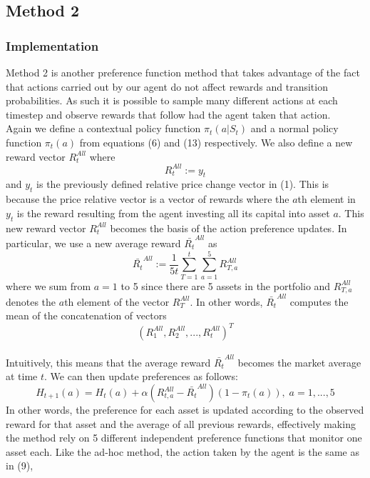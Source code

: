 \documentclass[a4paper,12pt]{article}
\begin{document}
\subsection{Method 2}

\subsubsection{Implementation}
Method 2 is another preference function method that takes advantage of the fact that actions carried out by our agent do not affect rewards and transition probabilities. As such it is possible to sample many different actions at each timestep and observe rewards that follow had the agent taken that action. \\
Again we define a contextual policy function $\pi_t (a|S_t)$ and a normal policy function $\pi_t (a)$ from equations (6) and (13) respectively.
We also define a new reward vector $R_{t}^{All}$ where
\begin{equation}
R_{t}^{All} := y_t
\end{equation}
and $y_t$ is the previously defined relative price change vector in (1). This is because the price relative vector is a vector of rewards where the $a$th element in $y_t$ is the reward  resulting from the agent investing all its capital into asset $a$. This new reward vector $R_{t}^{All}$ becomes the basis of the action preference updates. In particular, we use a new average reward $\bar{R_t}^{All}$ as
\begin{equation}
\bar{R_t}^{All} := \frac{1}{5t} \sum_{T=1}^{t} \sum_{a=1}^{5} R_{T,a}^{All}
\end{equation}
where we sum from $a=1$ to 5 since there are 5 assets in the portfolio and $R_{T,a}^{All}$ denotes the $a$th element of the vector $R_{T}^{All}$. In other words, $\bar{R_t}^{All}$ computes the mean of the concatenation of vectors
\begin{equation}
(R_1^{All},R_2^{All},...,R_t^{All})^T
\end{equation} \\
Intuitively, this means that the average reward $\bar{R_t}^{All}$ becomes the market average at time $t$. We can then update preferences as follows:
\begin{equation}
H_{t+1}(a) = H_t(a) + \alpha (R_{t,a}^{All} - \bar{R_t}^{All})(1 - \pi_t(a)), \; a = 1,...,5
\end{equation}
In other words, the preference for each asset is updated according to the observed reward for that asset and the average of all previous rewards, effectively making the method rely on 5 different independent preference functions that monitor one asset each. Like the ad-hoc method, the action taken by the agent is the same as in (9),
\end{document}
